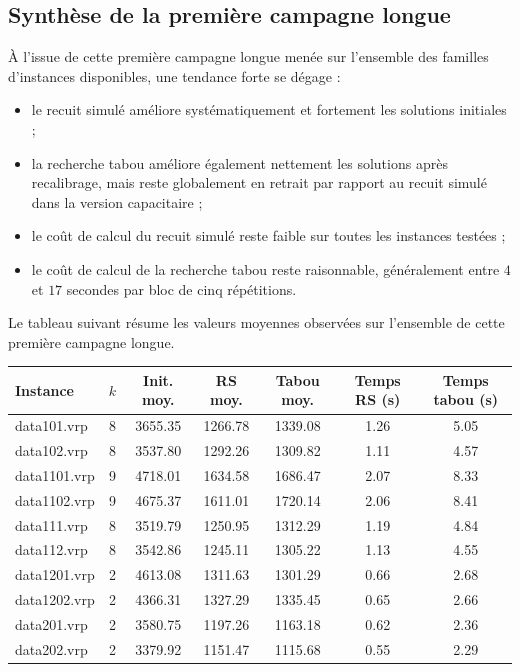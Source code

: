 \documentclass[11pt,a4paper]{article}
\begin{document}
\subsection{Synthèse de la première campagne longue}
À l'issue de cette première campagne longue menée sur l'ensemble des familles d'instances disponibles, une tendance forte se dégage :
\begin{itemize}
    \item le recuit simulé améliore systématiquement et fortement les solutions initiales ;
    \item la recherche tabou améliore également nettement les solutions après recalibrage, mais reste globalement en retrait par rapport au recuit simulé dans la version capacitaire ;
    \item le coût de calcul du recuit simulé reste faible sur toutes les instances testées ;
    \item le coût de calcul de la recherche tabou reste raisonnable, généralement entre \(4\) et \(17\) secondes par bloc de cinq répétitions.
\end{itemize}

Le tableau suivant résume les valeurs moyennes observées sur l'ensemble de cette première campagne longue.

\begin{center}
\begin{tabular}{lcccccc}
\toprule
Instance & \(k\) & Init. moy. & RS moy. & Tabou moy. & Temps RS (s) & Temps tabou (s) \\
\midrule
data101.vrp  & 8 & 3655.35 & 1266.78 & 1339.08 & 1.26  &  5.05 \\
data102.vrp  & 8 & 3537.80 & 1292.26 & 1309.82 & 1.11  &  4.57 \\
data1101.vrp & 9 & 4718.01 & 1634.58 & 1686.47 & 2.07  &  8.33 \\
data1102.vrp & 9 & 4675.37 & 1611.01 & 1720.14 & 2.06  &  8.41 \\
data111.vrp  & 8 & 3519.79 & 1250.95 & 1312.29 & 1.19  &  4.84 \\
data112.vrp  & 8 & 3542.86 & 1245.11 & 1305.22 & 1.13  &  4.55 \\
data1201.vrp & 2 & 4613.08 & 1311.63 & 1301.29 & 0.66  &  2.68 \\
data1202.vrp & 2 & 4366.31 & 1327.29 & 1335.45 & 0.65  &  2.66 \\
data201.vrp  & 2 & 3580.75 & 1197.26 & 1163.18 & 0.62  &  2.36 \\
data202.vrp  & 2 & 3379.92 & 1151.47 & 1115.68 & 0.55  &  2.29 \\
\bottomrule
\end{tabular}
\end{center}
\end{document}
